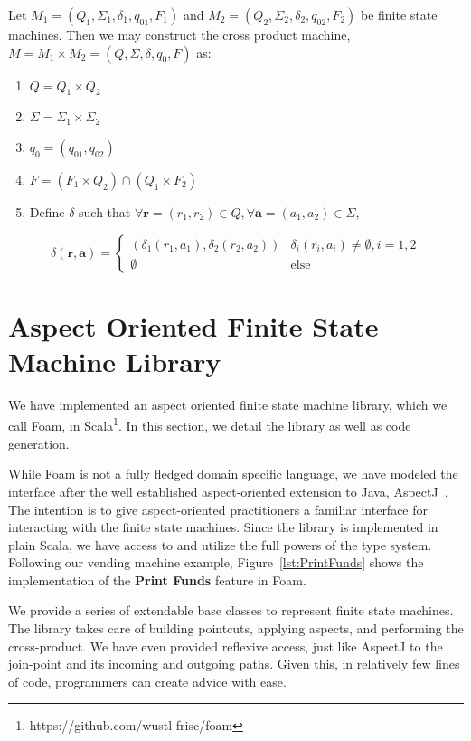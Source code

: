 \documentclass[sigplan,anonymous,review]{acmart}
\begin{document}
Let $M_1 = (Q_1, \Sigma_1, \delta_1, q_{01}, F_1)$ and $M_2 = (Q_2, \Sigma_2, \delta_2, q_{02}, F_2)$ be finite state machines. Then we may construct the cross product machine, $M = M_1 \times M_2 = (Q, \Sigma, \delta, q_0, F)$ as: 

\begin{enumerate}
    \item $Q = Q_1 \times Q_2$
    \item $\Sigma = \Sigma_1 \times \Sigma_2$
    \item $q_0 = (q_{01}, q_{02})$
    \item $F = (F_1 \times Q_2) \cap (Q_1 \times F_2)$
    \item Define $\delta$ such that $\forall \mathbf{r} = (r_1, r_2) \in Q, \forall \mathbf{a} = (a_1, a_2) \in \Sigma,$ 
\end{enumerate}
\[\delta(\mathbf r, \mathbf a) = \begin{cases}
    (\delta_1(r_1, a_1), \delta_2(r_2, a_2)) & \delta_i(r_i, a_i) \neq \emptyset, i = 1, 2\\
    \emptyset & \mathrm{else}
\end{cases}\]

\section{Aspect Oriented Finite State Machine Library}\label{sec:foam}
We have implemented an aspect oriented finite state machine library, which we call Foam,  in Scala\footnote{https://github.com/wustl-frisc/foam}. In this section, we detail the library as well as code generation.

While Foam is not a fully fledged domain specific language, we have modeled the interface after the well established aspect-oriented extension to Java, AspectJ~\cite{}. The intention is to give aspect-oriented practitioners a familiar interface for interacting with the finite state machines. Since the library is implemented in plain Scala, we have access to and utilize the full powers of the type system. Following our vending machine example, Figure~\ref{lst:PrintFunds} shows the implementation of the \textbf{Print Funds} feature in Foam.

We provide a series of extendable base classes to represent finite state machines. The library takes care of building pointcuts, applying aspects, and performing the cross-product. We have even provided reflexive access, just like AspectJ to the join-point and its incoming and outgoing paths. Given this, in relatively few lines of code, programmers can create advice with ease.
\end{document}
